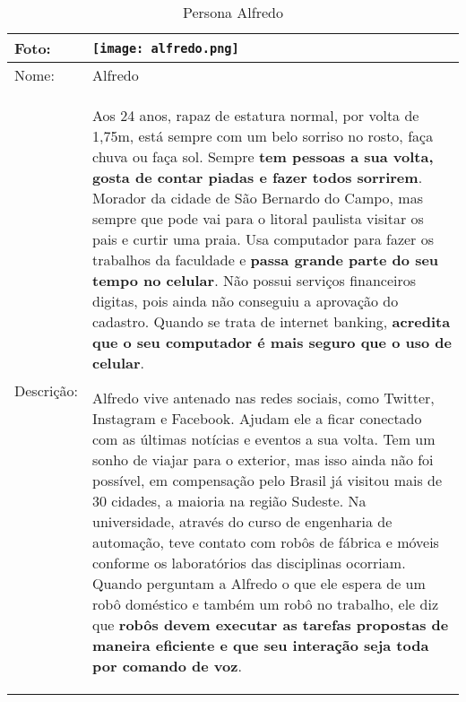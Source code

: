 \begin{table}[!ht]
	\caption{Persona Alfredo}
	\label{tab:alfredo}
	\centering
	\begin{tabular}{ m{2 cm} | m{13cm} }
		\hline
		Foto: & \rule{0cm}{2.7cm} \texttt{[image: alfredo.png]} \\
		\hline
		Nome: & Alfredo \\
		\hline
		Descrição: & Aos 24 anos, rapaz de estatura normal, por volta de 1,75m, está sempre com um belo sorriso no rosto, faça chuva ou faça sol. Sempre \textbf{tem pessoas a sua volta, gosta de contar piadas e fazer todos sorrirem}. Morador da cidade de São Bernardo do Campo, mas sempre que pode vai para o litoral paulista visitar os pais e curtir uma praia. Usa computador para fazer os trabalhos da faculdade e \textbf{passa grande parte do seu tempo no celular}. Não possui serviços financeiros digitas, pois ainda não conseguiu a aprovação do cadastro. Quando se trata de internet banking, \textbf{acredita que o seu computador é mais seguro que o uso de celular}.

		Alfredo vive antenado nas redes sociais, como Twitter, Instagram e Facebook. Ajudam ele a ficar conectado com as últimas notícias e eventos a sua volta. Tem um sonho de viajar para o exterior, mas isso ainda não foi possível, em compensação pelo Brasil já visitou mais de 30 cidades, a maioria na região Sudeste. Na universidade, através do curso de engenharia de automação, teve contato com robôs de fábrica e móveis conforme os laboratórios das disciplinas ocorriam. Quando perguntam a Alfredo o que ele espera de um robô doméstico e também um robô no trabalho, ele diz que \textbf{robôs devem executar as tarefas propostas de maneira eficiente e que seu interação seja toda por comando de voz}.\\
		\hline
	\end{tabular}
\end{table}

